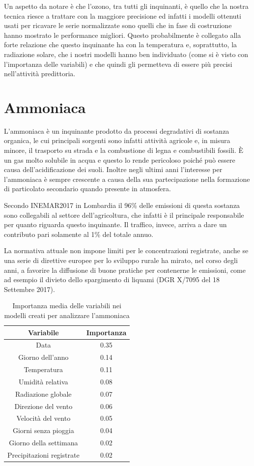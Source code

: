 Un aspetto da notare è che l'ozono, tra tutti gli inquinanti, è quello che la nostra tecnica riesce a trattare con la maggiore precisione ed infatti i modelli ottenuti usati per ricavare le serie normalizzate sono quelli che in fase di costruzione hanno mostrato le performance migliori. Questo probabilmente è collegato alla forte relazione che questo inquinante ha con la temperatura e, soprattutto, la radiazione solare, che i nostri modelli hanno ben individuato (come si è visto con l'importanza delle variabili) e che quindi gli permetteva di essere più precisi nell'attività predittoria.

\section{Ammoniaca}
L'ammoniaca è un inquinante prodotto da processi degradativi di sostanza organica, le cui principali sorgenti sono infatti attività agricole e, in misura minore, il trasporto su strada e la combustione di legna e combustibili fossili. È un gas molto solubile in acqua e questo lo rende pericoloso poiché può essere causa dell'acidificazione dei suoli. Inoltre negli ultimi anni l'interesse per l'ammoniaca è sempre crescente a causa della sua partecipazione nella formazione di particolato secondario quando presente in atmosfera.

Secondo INEMAR2017 in Lombardia il 96\% delle emissioni di questa sostanza sono collegabili al settore dell'agricoltura, che infatti è il principale responsabile per quanto riguarda questo inquinante. Il traffico, invece, arriva a dare un contributo pari solamente al 1\% del totale annuo.

La normativa attuale non impone limiti per le concentrazioni registrate, anche se una serie di direttive europee per lo sviluppo rurale ha mirato, nel corso degli anni, a favorire la diffusione di buone pratiche per contenerne le emissioni, come ad esempio il divieto dello spargimento di liquami (DGR X/7095 del 18 Settembre 2017). 

\begin{table}[h!]
\centering
\begin{tabular}{ |c c| }
	\hline
	Variabile & Importanza \\
	\hline
	Data & 0.35 \\
	Giorno dell'anno & 0.14 \\
	Temperatura & 0.11 \\
	Umidità relativa & 0.08 \\
	Radiazione globale & 0.07 \\
	Direzione del vento & 0.06 \\
	Velocità del vento & 0.05 \\
	Giorni senza pioggia & 0.04 \\
	Giorno della settimana & 0.02 \\
	Precipitazioni registrate & 0.02 \\
	\hline
\end{tabular}
\caption{Importanza media delle variabili nei modelli creati per analizzare l'ammoniaca}
\label{table:importanza_ammoniaca}
\end{table}

